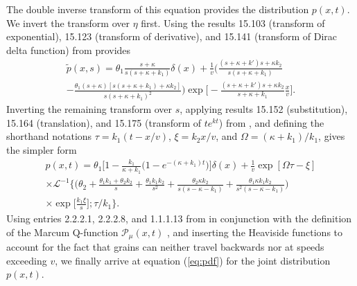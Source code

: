 \documentclass[draft,grl]{agujournal2018}
\newcommand\tp{\tilde{p}}
\newcommand\El{\mathcal{L}}
\begin{document}
The double inverse transform of this equation provides the distribution $p(x,t)$.
We invert the transform over $\eta$ first.
Using the results 15.103 (transform of exponential), 15.123 (transform of derivative), and 15.141 (transform of Dirac delta function) from \citet{Arfken1985} provides 
\begin{multline} \tp(x,s) = \theta_1 \frac{s+\kappa}{s(s+\kappa + k_1)}\delta(x) + \frac{1}{v} \Big(\frac{(s+\kappa+k')s+\kappa k_2}{s(s+\kappa+k_1)} \\- \frac{\theta_1(s+\kappa)[s(s+\kappa+k_1)+\kappa k_2]}{s(s+\kappa+k_1)^2}\Big)
\exp\Big[-\frac{(s+\kappa+k')s+\kappa k_2}{s+\kappa+k_1}\frac{x}{v}\Big].\end{multline}
Inverting the remaining transform over $s$, applying results 15.152 (substitution), 15.164 (translation), and 15.175 (transform of $te^{kt}$) from \citet{Arfken1985}, and defining the shorthand notations $\tau = k_1(t-x/v)$, $\xi = k_2 x/v$, and $\Omega = (\kappa + k_1)/k_1$, gives the simpler form 
\begin{multline}
p(x,t) = \theta_1\Big[1-\frac{k_1}{\kappa + k_1}\big(1-e^{-(\kappa + k_1)t}\big)\Big]\delta(x) + \frac{1}{v}\exp[\Omega \tau - \xi]\\
\times \El^{-1}\Big\{\Big( \theta_2 + \frac{\theta_1k_1+\theta_2 k_2}{s}+\frac{\theta_1k_1k_2}{s^2} + \frac{\theta_2\kappa k_2}{s(s-\kappa-k_1)} + \frac{\theta_1\kappa k_1 k_2}{s^2(s-\kappa-k_1)}\Big)\\
\times\exp\big[\frac{k_1 \xi}{s}\big];\tau/k_1\Big\}.
\end{multline}
Using entries 2.2.2.1, 2.2.2.8, and 1.1.1.13 from \citet{Prudnikov1992a} in conjunction with the definition of the Marcum Q-function $ \mathcal{P}_\mu(x,t)$ \citep[e.g.,][]{Temme1996}, and inserting the Heaviside functions to account for the fact that grains can neither travel backwards nor at speeds exceeding $v$, we finally arrive at equation (\ref{eq:pdf}) for the joint distribution $p(x,t)$.
\end{document}
